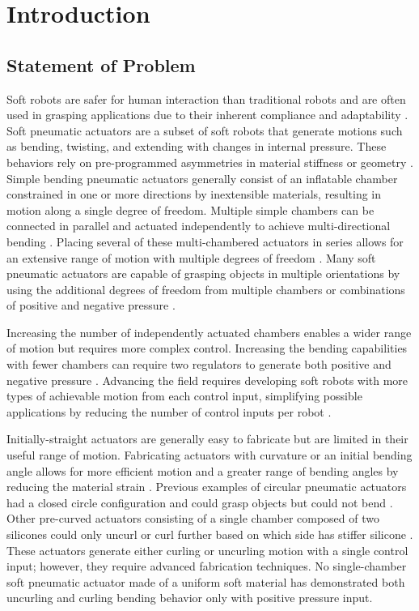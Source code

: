 \chapter{Introduction}
\section{Statement of Problem}
Soft robots are safer for human interaction than traditional robots and are often used in grasping applications due to their inherent compliance and adaptability \cite{laschi_soft_2016, hotoda_octopus-like_2023}. Soft pneumatic actuators are a subset of soft robots that generate motions such as bending, twisting, and extending with changes in internal pressure. These behaviors rely on pre-programmed asymmetries in material stiffness or geometry \cite{galloway_mechanically_2013, mccandless_soft_2022, ellis_generative_2022}. Simple bending pneumatic actuators generally consist of an inflatable chamber constrained in one or more directions by inextensible materials, resulting in motion along a single degree of freedom. Multiple simple chambers can be connected in parallel and actuated independently to achieve multi-directional bending \cite{bilodeau_design_2018, pagoli_soft_2021}. Placing several of these multi-chambered actuators in series allows for an extensive range of motion with multiple degrees of freedom \cite{feng_body_2020, nguyen_anguilliform_2022, arachchige_wheelless_2023}. Many soft pneumatic actuators are capable of grasping objects in multiple orientations by using the additional degrees of freedom from multiple chambers \cite{fei_novel_2019} or combinations of positive and negative pressure \cite{ariyanto_three-fingered_2019}. 

Increasing the number of independently actuated chambers enables a wider range of motion but requires more complex control. Increasing the bending capabilities with fewer chambers can require two regulators to generate both positive and negative pressure \cite{fatahillah_novel_2020}. Advancing the field requires developing soft robots with more types of achievable motion from each control input, simplifying possible applications by reducing the number of control inputs per robot \cite{gorissen_elastic_2017}.

Initially-straight actuators are generally easy to fabricate but are limited in their useful range of motion. Fabricating actuators with curvature or an initial bending angle allows for more efficient motion and a greater range of bending angles by reducing the material strain \cite{perez-guagnelli_deflected_2022}. Previous examples of circular pneumatic actuators had a closed circle configuration and could grasp objects but could not bend \cite{al-ibadi_circular_2018}. Other pre-curved actuators consisting of a single chamber composed of two silicones could only uncurl or curl further based on which side has stiffer silicone \cite{hu_precurved_2022}. These actuators generate either curling or uncurling motion with a single control input; however, they require advanced fabrication techniques. No single-chamber soft pneumatic actuator made of a uniform soft material has demonstrated both uncurling and curling bending behavior only with positive pressure input. 

